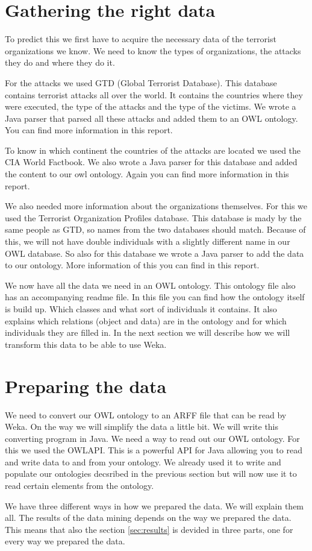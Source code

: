 \documentclass[a4]{article}
\begin{document}
\section{Gathering the right data}
\label{sec:gathering_data}
To predict this we first have to acquire the necessary data of the terrorist organizations we know. We need to know the types of organizations, the attacks they do and where they do it.\par
For the attacks we used GTD (Global Terrorist Database)\cite{gtd}. This database contains terrorist attacks all over the world. It contains the countries where they were executed, the type of the attacks and the type of the victims. We wrote a Java parser that parsed all these attacks and added them to an OWL ontology. You can find more information in this\cite{homework2} report.\par To know in which continent the countries of the attacks are located we used the CIA World Factbook\cite{factbook}. We also wrote a Java parser for this database and added the content to our owl ontology. Again you can find more information in this\cite{homework2} report.\par
We also needed more information about the organizations themselves. For this we used the Terrorist Organization Profiles database\cite{start}. This database is mady by the same people as GTD, so names from the two databases should match. Because of this, we will not have double individuals with a slightly different name in our OWL database. So also for this database we wrote a Java parser to add the data to our ontology. More information of this you can find in this\cite{homework3} report.\par
We now have all the data we need in an OWL ontology. This ontology file also has an accompanying readme file. In this file you can find how the ontology itself is build up. Which classes and what sort of individuals it contains. It also explains which relations (object and data) are in the ontology and for which individuals they are filled in. In the next section we will describe how we will transform this data to be able to use Weka.
\section{Preparing the data}
\label{sec:preparing_data}
We need to convert our OWL ontology to an ARFF file that can be read by Weka. On the way we will simplify the data a little bit. We will write this converting program in Java. We need a way to read out our OWL ontology. For this we used the OWLAPI\cite{owlapi}. This is a powerful API for Java allowing you to read and write data to and from your ontology. We already used it to write and populate our ontologies decsribed in the previous section but will now use it to read certain elements from the ontology.\par
We have three different ways in how we prepared the data. We will explain them all. The results of the data mining depends on the way we prepared the data. This means that also the section \ref{sec:results} is devided in three parts, one for every way we prepared the data.\par
\end{document}
